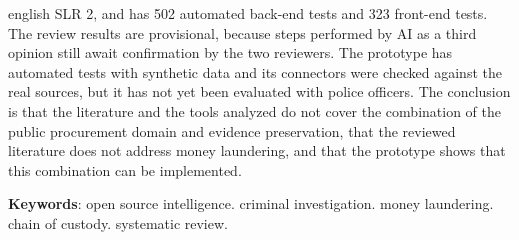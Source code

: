 \begin{resumo}[Abstract]
\begin{otherlanguage*}{english}
   SLR 2, and has 502
   automated back-end tests and 323 front-end tests. The review results are
   provisional, because steps performed by AI as a third opinion still await
   confirmation by the two reviewers. The prototype has automated tests with synthetic
   data and its connectors were checked against the real sources, but it has not yet been evaluated with police officers. The conclusion is that the literature and the tools
   analyzed do not cover the combination of the public procurement domain and
   evidence preservation, that the reviewed literature does not address
   money laundering, and that the prototype shows that this combination can
   be implemented.

   \vspace{\onelineskip}

   \noindent
   \textbf{Keywords}: open source intelligence. criminal investigation.
   money laundering. chain of custody. systematic review.
 \end{otherlanguage*}
\end{resumo}
